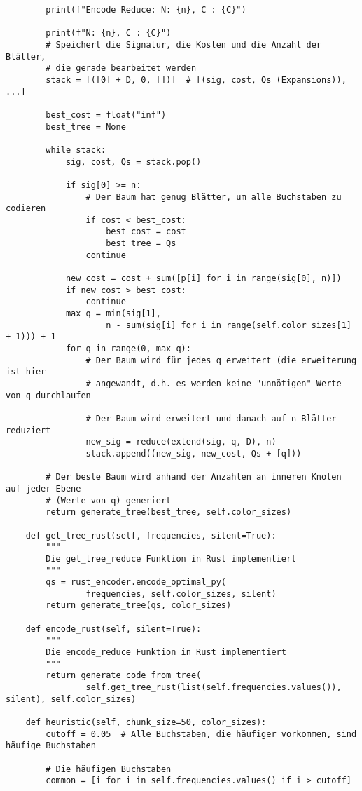 \documentclass[a4paper,10pt,ngerman]{scrartcl}
\begin{document}
\begin{verbatim}
        print(f"Encode Reduce: N: {n}, C : {C}")

        print(f"N: {n}, C : {C}")
        # Speichert die Signatur, die Kosten und die Anzahl der Blätter,
        # die gerade bearbeitet werden
        stack = [([0] + D, 0, [])]  # [(sig, cost, Qs (Expansions)), ...]

        best_cost = float("inf")
        best_tree = None

        while stack:
            sig, cost, Qs = stack.pop()

            if sig[0] >= n:
                # Der Baum hat genug Blätter, um alle Buchstaben zu codieren
                if cost < best_cost:
                    best_cost = cost
                    best_tree = Qs
                continue

            new_cost = cost + sum([p[i] for i in range(sig[0], n)])
            if new_cost > best_cost:
                continue
            max_q = min(sig[1],
                    n - sum(sig[i] for i in range(self.color_sizes[1] + 1))) + 1
            for q in range(0, max_q):
                # Der Baum wird für jedes q erweitert (die erweiterung ist hier
                # angewandt, d.h. es werden keine "unnötigen" Werte von q durchlaufen

                # Der Baum wird erweitert und danach auf n Blätter reduziert
                new_sig = reduce(extend(sig, q, D), n)
                stack.append((new_sig, new_cost, Qs + [q]))

        # Der beste Baum wird anhand der Anzahlen an inneren Knoten auf jeder Ebene
        # (Werte von q) generiert
        return generate_tree(best_tree, self.color_sizes)

    def get_tree_rust(self, frequencies, silent=True):
        """
        Die get_tree_reduce Funktion in Rust implementiert
        """
        qs = rust_encoder.encode_optimal_py(
                frequencies, self.color_sizes, silent)
        return generate_tree(qs, color_sizes)

    def encode_rust(self, silent=True):
        """
        Die encode_reduce Funktion in Rust implementiert
        """
        return generate_code_from_tree(
                self.get_tree_rust(list(self.frequencies.values()), silent), self.color_sizes)

    def heuristic(self, chunk_size=50, color_sizes):
        cutoff = 0.05  # Alle Buchstaben, die häufiger vorkommen, sind häufige Buchstaben

        # Die häufigen Buchstaben
        common = [i for i in self.frequencies.values() if i > cutoff]


\end{verbatim}
\end{document}
